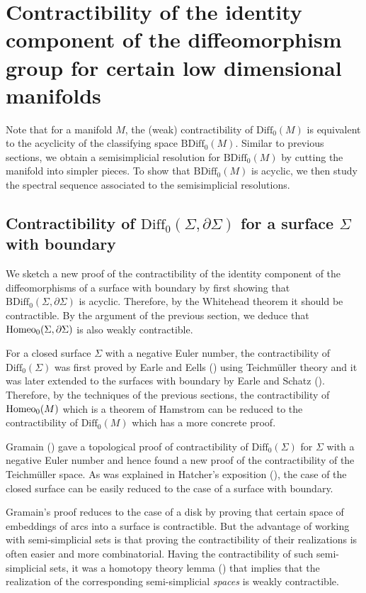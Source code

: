 \documentclass[a4paper]{amsart}
\theoremstyle{definition}
\theoremstyle{remark}
\newcommand\Diff{\mathrm{Diff}}
\newcommand\BDiff{\mathrm{BDiff}}
\newcommand{\tH}{\text{\textnormal{Homeo}}}
\numberwithin{equation}{section}
\begin{document}
\section{Contractibility of the identity component of the diffeomorphism group for certain low dimensional manifolds}\label{sec4} Note that for a manifold $M$, the (weak) contractibility of $\Diff_0(M)$ is equivalent to the acyclicity of the classifying space $\BDiff_0(M)$. Similar to previous sections, we obtain a semisimplicial resolution for $\BDiff_0(M)$ by cutting the manifold into simpler pieces. To show  that $\BDiff_0(M)$ is acyclic, we then study the spectral sequence associated to the semisimplicial resolutions.
\subsection{Contractibility of $\Diff_0(\Sigma,\partial\Sigma)$ for a surface $\Sigma$ with  boundary} We sketch a new proof of the contractibility of the identity component of the diffeomorphisms of a surface with  boundary by first showing that $\BDiff_0(\Sigma,\partial \Sigma)$ is acyclic. Therefore, by the Whitehead theorem it should be contractible.  By the argument of the previous section, we deduce that $\tH_0(\Sigma,\partial \Sigma)$ is also weakly contractible.

For a closed surface $\Sigma$ with a negative Euler number, the contractibility of $\Diff_0(\Sigma)$ was first proved by Earle and Eells (\cite{earle1969fibre}) using Teichm\"{u}ller theory and it was later extended to the surfaces with boundary by Earle and Schatz (\cite{MR0277000}). Therefore, by the techniques of the previous sections, the contractibility of $\tH_0(M)$ which is a theorem of Hamstrom \cite{hamstrom1974homotopy} can be reduced to the contractibility of $\Diff_0(M)$ which has a more concrete proof. 

Gramain (\cite{MR0326773}) gave a topological proof of contractibility of $\Diff_0(\Sigma)$ for  $\Sigma$ with a negative Euler number and hence found a new proof of the contractibility of the Teichm\"{u}ller space.  As was explained in Hatcher's exposition (\cite[Appendix B]{hatcher2011short}), the case of the closed surface can be easily reduced to the case of a surface with boundary. 

Gramain's proof reduces to the case of a disk by proving that certain space of embeddings of arcs into a surface is contractible. But the advantage of working with semi-simplicial sets is that proving the contractibility of their realizations is often easier and more combinatorial. Having the contractibility of such semi-simplicial sets, it was a homotopy theory lemma () that implies that the realization of the corresponding semi-simplicial {\it spaces} is weakly contractible.  
\end{document}
